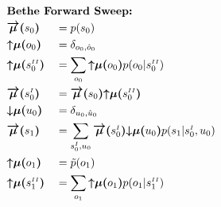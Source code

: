 \documentclass[fleqn]{article}
\begin{document}
\noindent
\setlength{\jot}{0.7em}
\begin{minipage}[t]{0.5\textwidth}
    \begin{alignat}{2}
         & \rlap{\text{\bfseries Bethe Forward Sweep:}} \nonumber                                                                                                                                                                                         \\
         & \bm{\overrightarrow{\mu}(}s_0\bm{)}                        &  & = p(s_0)                                                                                                                                                                       \\
         & \bm{{\uparrow}{\mu}(}o_0\bm{)}                             &  & = \delta_{o_0, \hat{o}_0}                                                                                                                                                      \\
         & \bm{{\uparrow}{\mu}(}s^{\scriptscriptstyle II}_0\bm{)}     &  & = \sum_{o_0} \bm{{\uparrow}{\mu}(}o_0\bm{)} p(o_0|s^{\scriptscriptstyle II}_0)                                                                                                  \\
         & \bm{\overrightarrow{\mu}(}s^{\scriptscriptstyle I}_0\bm{)} &  & = \bm{\overrightarrow{\mu}(}s_0\bm{)} \bm{{\uparrow}{\mu}(}s^{\scriptscriptstyle II}_0\bm{)}                                                                                   \\
         & \bm{{\downarrow}{\mu}(}u_0\bm{)}                           &  & = \delta_{u_0,\hat{u}_0}                                                                                                                                                       \\
         & \bm{\overrightarrow{\mu}(}s_1\bm{)}                        &  & = \sum_{s^{\scriptscriptstyle I}_0, u_0} \bm{\overrightarrow{\mu}(}s^{\scriptscriptstyle I}_0\bm{)} \bm{{\downarrow}{\mu}(}u_0\bm{)} p(s_1|{s^{\scriptscriptstyle I}_0},u_0)   \\
         & \bm{{\uparrow}{\mu}(}o_1\bm{)}                             &  & = \tilde{p}(o_1)                                                                                                                                                               \\
         & \bm{{\uparrow}{\mu}(}s^{\scriptscriptstyle II}_1\bm{)}     &  & = \sum_{o_1} \bm{{\uparrow}{\mu}(}o_1\bm{)} p(o_1|s^{\scriptscriptstyle II}_1)                                                                                                   \\

\end{alignat}
\end{minipage}
\end{document}
